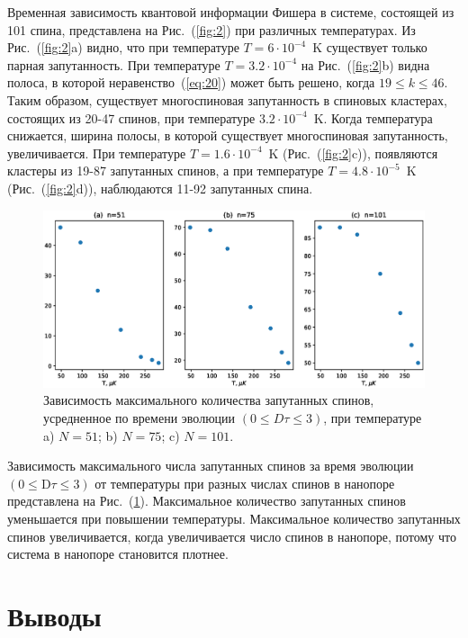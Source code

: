 \documentclass[utf8]{jetp}
\begin{document}
Временная зависимость квантовой информации Фишера в системе, состоящей из 101 спина, представлена на Рис.~(\ref{fig:2}) при различных температурах.
Из Рис.~(\ref{fig:2}a) видно, что при температуре $T=6\cdot10^{-4}$~K существует только парная запутанность.
При температуре $T=3.2\cdot10^{-4}$ на Рис.~(\ref{fig:2}b) видна полоса, в которой неравенство~(\ref{eq:20}) может быть решено, когда $19 \leq k \leq 46$.
Таким образом, существует многоспиновая запутанность в спиновых кластерах, состоящих из 20-47 спинов, при температуре $3.2\cdot10^{-4}$~K.
Когда температура снижается, ширина полосы, в которой существует многоспиновая запутанность, увеличивается.
При температуре $T=1.6\cdot10^{-4}$~K (Рис.~(\ref{fig:2}c)), появляются кластеры из 19-87 запутанных спинов, а при температуре $T=4.8\cdot10^{-5}$~K (Рис.~(\ref{fig:2}d)), наблюдаются 11-92 запутанных спина.

\begin{figure}
 	\includegraphics[width=0.95\linewidth]{entangled_spins_by_n.eps}
	\caption{
	  Зависимость максимального количества запутанных спинов,
	  усредненное по времени эволюции $(0 \leq D\tau \leq 3)$,
	  при температуре a) $N=51$; b) $N=75$; c) $N=101$.
	}
	\label{fig:3}
\end{figure}

Зависимость максимального числа запутанных спинов за время эволюции $({0}\leq \mathrm{D}\tau\leq{3})$ от температуры при разных числах спинов в нанопоре представлена на Рис.~(\ref{fig:3}).
Максимальное количество запутанных спинов уменьшается при повышении температуры.
Максимальное количество запутанных спинов увеличивается, когда увеличивается число спинов в нанопоре, потому что система в нанопоре становится плотнее.



\section{Выводы}
\label{sec:6}
\end{document}
